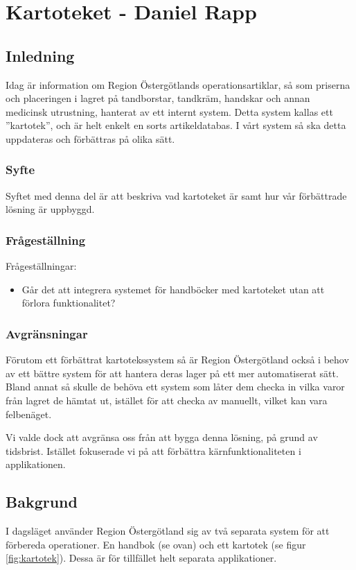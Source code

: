 \section{Kartoteket - Daniel Rapp}
\subsection{Inledning}
Idag är information om Region Östergötlands operationsartiklar, så som priserna och
placeringen i lagret på tandborstar, tandkräm, handskar och annan
medicinsk utrustning, hanterat av ett internt system.
Detta system kallas ett ''kartotek'', och är helt enkelt en sorts artikeldatabas.
I vårt system så ska detta uppdateras och förbättras på olika sätt.

\subsubsection{Syfte}
Syftet med denna del är att beskriva vad kartoteket är samt
hur vår förbättrade lösning är uppbyggd.


\subsubsection{Frågeställning}
Frågeställningar:
\begin{itemize}
  \item Går det att integrera systemet för handböcker med kartoteket utan att förlora funktionalitet?
\end{itemize}


\subsubsection{Avgränsningar}
Förutom ett förbättrat kartotekssystem så är Region Östergötland också i behov av
ett bättre system för att hantera deras lager på ett mer automatiserat sätt.
Bland annat så skulle de behöva ett system som låter dem checka in vilka varor från lagret de hämtat
ut, istället för att checka av manuellt, vilket kan vara felbenäget.

Vi valde dock att avgränsa oss från att bygga denna lösning, på grund av tidsbrist.
Istället fokuserade vi på att förbättra kärnfunktionaliteten i applikationen.


\clearpage
\subsection{Bakgrund}
I dagsläget använder Region Östergötland sig av två separata system
för att förbereda operationer. En handbok (se ovan) och ett kartotek (se figur \ref{fig:kartotek}).
Dessa är för tillfället helt separata applikationer.

